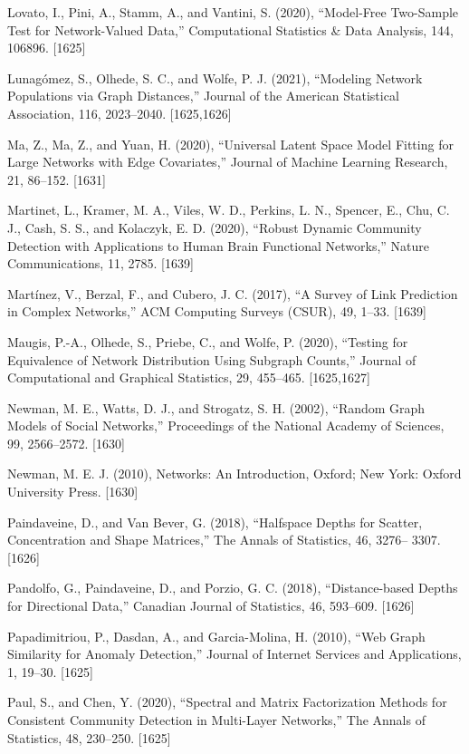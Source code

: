 \documentclass[
  10
]{article}
\begin{document}
Lovato, I., Pini, A., Stamm, A., and Vantini, S. (2020), ``Model-Free
Two-Sample Test for Network-Valued Data,'' Computational Statistics \&
Data Analysis, 144, 106896. {[}1625{]}

Lunagómez, S., Olhede, S. C., and Wolfe, P. J. (2021), ``Modeling
Network Populations via Graph Distances,'' Journal of the American
Statistical Association, 116, 2023--2040. {[}1625,1626{]}

Ma, Z., Ma, Z., and Yuan, H. (2020), ``Universal Latent Space Model
Fitting for Large Networks with Edge Covariates,'' Journal of Machine
Learning Research, 21, 86--152. {[}1631{]}

Martinet, L., Kramer, M. A., Viles, W. D., Perkins, L. N., Spencer, E.,
Chu, C. J., Cash, S. S., and Kolaczyk, E. D. (2020), ``Robust Dynamic
Community Detection with Applications to Human Brain Functional
Networks,'' Nature Communications, 11, 2785. {[}1639{]}

Martínez, V., Berzal, F., and Cubero, J. C. (2017), ``A Survey of Link
Prediction in Complex Networks,'' ACM Computing Surveys (CSUR), 49,
1--33. {[}1639{]}

Maugis, P.-A., Olhede, S., Priebe, C., and Wolfe, P. (2020), ``Testing
for Equivalence of Network Distribution Using Subgraph Counts,'' Journal
of Computational and Graphical Statistics, 29, 455--465. {[}1625,1627{]}

Newman, M. E., Watts, D. J., and Strogatz, S. H. (2002), ``Random Graph
Models of Social Networks,'' Proceedings of the National Academy of
Sciences, 99, 2566--2572. {[}1630{]}

Newman, M. E. J. (2010), Networks: An Introduction, Oxford; New York:
Oxford University Press. {[}1630{]}

Paindaveine, D., and Van Bever, G. (2018), ``Halfspace Depths for
Scatter, Concentration and Shape Matrices,'' The Annals of Statistics,
46, 3276-- 3307. {[}1626{]}

Pandolfo, G., Paindaveine, D., and Porzio, G. C. (2018),
``Distance-based Depths for Directional Data,'' Canadian Journal of
Statistics, 46, 593--609. {[}1626{]}

Papadimitriou, P., Dasdan, A., and Garcia-Molina, H. (2010), ``Web Graph
Similarity for Anomaly Detection,'' Journal of Internet Services and
Applications, 1, 19--30. {[}1625{]}

Paul, S., and Chen, Y. (2020), ``Spectral and Matrix Factorization
Methods for Consistent Community Detection in Multi-Layer Networks,''
The Annals of Statistics, 48, 230--250. {[}1625{]}
\end{document}
